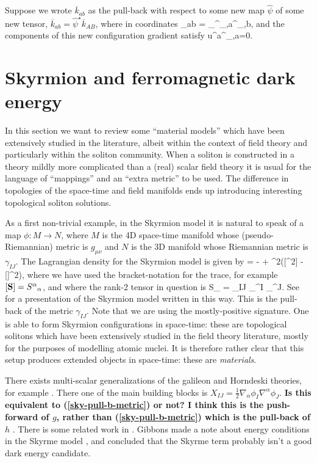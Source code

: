 Suppose we wrote $\overline{k}_{ab}$ as the pull-back with respect to some new map $\widehat{\psi}$ of some new tensor, $\overline{k}_{ab}=\widehat{\psi}^{\star}\overline{k}_{AB}$, where in coordinates
\bea
{}_{ab} = _{}{\widehat{\phi}^{}}{}_{,a}{\widehat{\phi}^{}}{}_{,b},
\eea
and the components of this new configuration gradient satisfy
\bea
u^a{\widehat{\phi}^{}}{}_{,a}=0.
\eea
\section{Skyrmion and ferromagnetic dark energy}
 In this section we want to review some  ``material models'' which have been extensively studied in the literature, albeit within the context of field theory and particularly within the soliton community. When a soliton is constructed in a theory mildly more complicated than a (real) scalar field theory it is usual for the language of ``mappings'' and an ``extra metric'' to be used. The difference in topologies of the space-time and field manifolds ends up introducing interesting topological soliton solutions.

As a first non-trivial example, in the Skyrmion model it is natural to speak of a map $\phi : M \rightarrow N$, where $M$ is the 4D space-time manifold whose (pseudo-Riemannian) metric is $g_{\mu\nu}$ and $N$ is the 3D manifold whose Riemannian metric is $\gamma_{IJ}$. The  Lagrangian density for the Skyrmion model is given by
\bse
\label{eq:sec:lag-sky-model}
\bea
\label{eq:sec:lag-sky}
 = - \half [\rbm{S}] + \alpha^2\left([^2] -    []^2\right),
\eea
where we have used the bracket-notation for the trace, for example $[{\bf{S}}] = {S^{\alpha}}_{\alpha}$, and where the rank-2 tensor in question is
\bea
\label{sky-pull-b-metric}
S_{\alpha\beta} = \gamma_{IJ} \partial_{\alpha}\phi^I \partial_{\beta}\phi^J.
\eea
\ese
See \cite{pdes_gr_rendall, Bizon:2007qz} for a presentation of the Skyrmion model written in this way. This is the pull-back of the metric $\gamma_{IJ}$. Note that we are using the mostly-positive signature. One is able to form Skyrmion configurations in space-time: these are topological solitons \cite{dur4361} which have been extensively studied in the field theory literature, mostly for the purposes of modelling atomic nuclei. It is therefore rather clear that this setup produces extended objects in space-time: these are \textit{materials}. 

There exists multi-scalar generalizations of the galileon and Horndeski theories, for example \cite{Deffayet:2010zh, Padilla:2010de, Hinterbichler:2010xn, Padilla:2012dx}. There one of the main building blocks is $X_{IJ}  = \tfrac{1}{2}\nabla_{\alpha}\phi_I \nabla^{\alpha}\phi_J$. \textbf{Is this equivalent to (\ref{sky-pull-b-metric}) or not? I think this is the push-forward of $g$, rather than (\ref{sky-pull-b-metric}) which is the pull-back of $h$ }. There is some related work in \cite{Padilla:2010ir}. Gibbons made a note about energy conditions in the Skyrme model \cite{Gibbons:2003cp}, and concluded that the Skyrme term probably isn't a good dark energy candidate.

